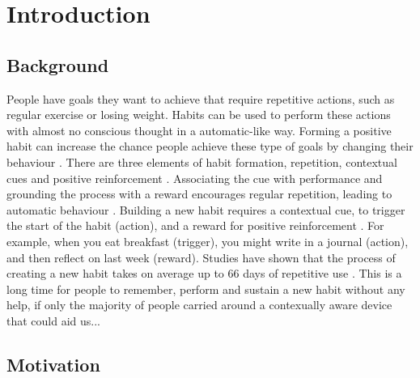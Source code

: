 
\section{Introduction}

\subsection*{Background}
People have goals they want to achieve that require repetitive actions, such as regular exercise or losing weight. Habits can be used to perform these actions with almost no conscious thought in a automatic-like way. Forming a positive habit can increase the chance people achieve these type of goals by changing their behaviour \cite{article_promoting_habit_formation}. There are three elements of habit formation, repetition, contextual cues and positive reinforcement \cite{article_beyond_self_tracking_designing_apps}. Associating the cue with performance and grounding the process with a reward encourages regular repetition, leading to automatic behaviour \cite{article_experiences_of_habit_formation}. Building a new habit requires a contextual cue, to trigger the start of the habit (action), and a reward for positive reinforcement \cite{article_beyond_self_tracking_designing_apps}. For example, when you eat breakfast (trigger), you might write in a journal (action), and then reflect on last week (reward). Studies have shown that the process of creating a new habit takes on average up to 66 days of repetitive use \cite{article_how_habits_formed_modelling_habit_formation}. This is a long time for people to remember, perform and sustain a new habit without any help, if only the majority of people carried around a contexually aware device that could aid us...

\subsection*{Motivation}

